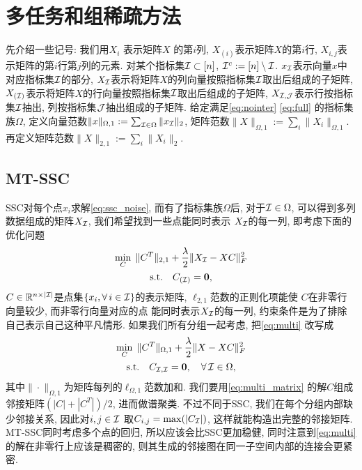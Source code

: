 \section{多任务和组稀疏方法}
先介绍一些记号: 我们用\(X_i\) 表示矩阵\(X\) 的第\(i\)列,
\(X_{(i)}\)表示矩阵\(X\)的第\(i\)行,
\(X_{i,j}\)表示矩阵的第\(i\)行第\(j\)列的元素.
对某个指标集\(\mathcal{I}\subset [n]\), \(\mathcal{I}^c:=[n]\setminus \mathcal{I}\).
\(x_{\mathcal{I}}\)表示向量\(x\)中对应指标集\(\mathcal{I}\)的部分,
\(X_{\mathcal{I}}\)表示将矩阵\(X\)的列向量按照指标集\(\mathcal{I}\)取出后组成的子矩阵, 
\(X_{(\mathcal{I})}\)表示将矩阵\(X\)的行向量按照指标集\(\mathcal{I}\)取出后组成的子矩阵,
\(X_{\mathcal{I}, \mathcal{J}}\)表示行按指标集\(\mathcal{I}\)抽出, 列按指标集\(\mathcal{J}\)抽出组成的子矩阵. 
给定满足\eqref{eq:nointer} \eqref{eq:full} 的指标集族\(\Omega\),
定义向量范数\(\|x\|_{\Omega, 1}:=\sum_{\mathcal{I} \in \Omega} \|x_{\mathcal{I}}\|_2\),
矩阵范数\(\|X\|_{\Omega, 1}:=\sum_{i} \|X_i\|_{\Omega, 1}\).
再定义矩阵范数\(\|X\|_{2, 1}:=\sum_{i} \|X_i\|_2\).

\subsection{MT-SSC}
SSC对每个点\(x_i\)求解\eqref{eq:ssc_noise}, 
而有了指标集族\(\Omega\)后, 对于\(\mathcal{I}\in \Omega\),
可以得到多列数据组成的矩阵\(X_{\mathcal{I}}\), 我们希望找到一些点能同时表示
\(X_{\mathcal{I}}\)的每一列, 即考虑下面的优化问题
\begin{equation}\label{eq:multi}
  \begin{gathered}
    \min_{C}\; \|C^T\|_{2, 1} + \frac{\lambda}{2} \|X_{\mathcal{I}} - XC\|_F^2\\
    \text{s.t.} \quad C_{(\mathcal{I})} = \mathbf{0},
  \end{gathered}
\end{equation}
\(C \in \mathbb{R}^{n \times |\mathcal{I}|}\)是点集\(\{x_i, \forall\, i\in \mathcal{I}\}\)的表示矩阵,
\(\ell_{2,1}\)范数的正则化项能使 \(C\)在非零行向量较少, 而非零行向量对应的点
能同时表示\(X_{\mathcal{I}}\)的每一列, 约束条件是为了排除自己表示自己这种平凡情形.
如果我们所有分组一起考虑, 把\eqref{eq:multi} 改写成
\begin{equation}\label{eq:multi_matrix}
  \begin{gathered}
    \min_C\; \|C^T\|_{\Omega, 1} + \frac{\lambda}{2} \|X-XC\|_F^2 \\
    \text{s.t.} \quad C_{\mathcal{I}, \mathcal{I}} = \mathbf{0}, \quad \forall \, \mathcal{I} \in
    \Omega,
  \end{gathered}
\end{equation}
其中\(\|\cdot\|_{\Omega, 1}\)为矩阵每列的\(\ell_{\Omega, 1}\)范数加和.
我们要用\eqref{eq:multi_matrix} 的解\(C\)组成邻接矩阵\((|C|+|C^T|)/2\),
进而做谱聚类. 不过不同于SSC, 我们在每个分组内部缺少邻接关系,
因此对\(i, j\in\mathcal{I}\) 取\(C_{i, j} = \max(|C_{\mathcal{I}}|)\), 这样就能构造出完整的邻接矩阵.
MT-SSC同时考虑多个点的回归, 所以应该会比SSC更加稳健, 同时注意到\eqref{eq:multi} 
的解在非零行上应该是稠密的, 则其生成的邻接图在同一子空间内部的连接会更紧密.

